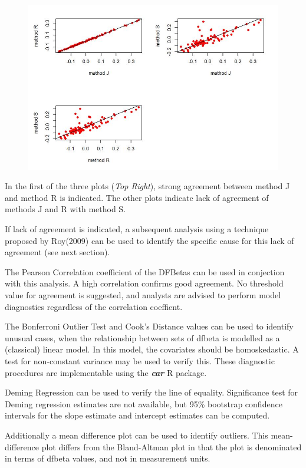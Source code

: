 \documentclass[12pt, a4paper]{report}
\theoremstyle{plain}
\theoremstyle{definition}
\theoremstyle{remark}
\begin{document}
	\begin{figure}[h!]
		\centering
		\includegraphics[width=0.9\linewidth]{images/04-DFbetaplots}
	\end{figure}
	
	In the first of the three plots (\textit{Top Right}), strong agreement between method J and method R is indicated. The other plots indicate lack of agreement of methods J and R with method S.
	
	
	
	If lack of agreement is indicated, a subsequent analysis using a technique proposed by Roy(2009) can be used to identify the specific cause for this lack of agreement (see next section).
	
	
	The Pearson Correlation coefficient of the DFBetas can be used in conjection with this analysis. A high correlation confirms good agreement. No threshold value for agreement is suggested, and analysts are advised to perform model diagnostics regardless of the correlation coeffient. 
	
	
	The Bonferroni Outlier Test and Cook's Distance values can be used to identify unusual cases, when the relationship between sets of dfbeta is modelled as a (classical) linear model. In this model, the covariates should be homoskedastic. A test for non-constant variance may be used to verify this. These diagnostic procedures are implementable using the \textbf{\textit{car}} R package.
	
	
	Deming Regression can be used to verify the line of equality. Significance test for Deming regression estimates are not available, but 95\% bootstrap confidence intervals for the slope estimate and intercept estimates can be computed. 
	
	
	Additionally a mean difference plot can be used to identify outliers. This mean-difference plot differs from the Bland-Altman plot in that the plot is denominated in terms of dfbeta values, and not in measurement units.
	
\end{document}
